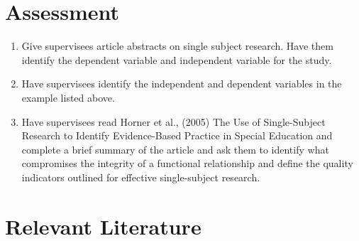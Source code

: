 \section{Assessment}
\begin{enumerate}
\item Give supervisees article abstracts on single subject research. Have them identify the dependent variable and independent variable for the study.
\item Have supervisees identify the independent and dependent variables in the example listed above.
\item Have supervisees read Horner et al., (2005) The Use of Single-Subject Research to Identify Evidence-Based Practice in Special Education and complete a brief summary of the article and ask them to identify what compromises the integrity of a functional relationship and define the quality indicators outlined for effective single-subject research.
\end{enumerate}

%
\section{Relevant Literature} 
\begin{refsection}
\nocite{test,alang2017police,clayton2018black}
\printbibliography[heading=none]
\end{refsection}%

